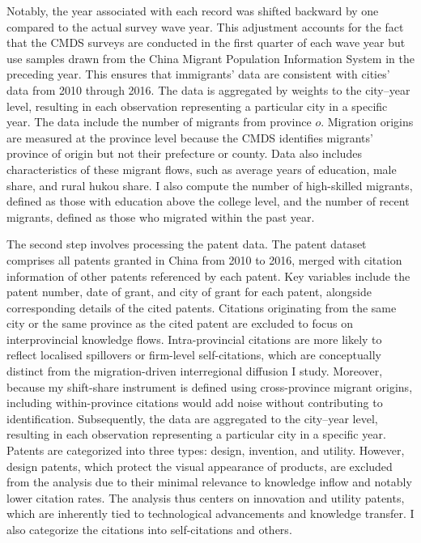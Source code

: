 \documentclass[12pt]{article}
\begin{document}
Notably, the year associated with each record was shifted backward by one compared to the actual survey wave year. This adjustment accounts for the fact that the CMDS surveys are conducted in the first quarter of each wave year but use samples drawn from the China Migrant Population Information System in the preceding year. This ensures that immigrants' data are consistent with cities' data from 2010 through 2016.
The data is aggregated by weights to the city--year level, resulting in each observation representing a particular city in a specific year. The data include the number of migrants from province $o$. Migration origins are measured at the province level because the CMDS identifies migrants' province of origin but not their prefecture or county. Data also includes characteristics of these migrant flows, such as average years of education, male share, and rural hukou share. I also compute the number of high-skilled migrants, defined as those with education above the college level, and the number of recent migrants, defined as those who migrated within the past year.

The second step involves processing the patent data. The patent dataset comprises all patents granted in China from 2010 to 2016, merged with citation information of other patents referenced by each patent. Key variables include the patent number, date of grant, and city of grant for each patent, alongside corresponding details of the cited patents.
Citations originating from the same city or the same province as the cited patent are excluded to focus on interprovincial knowledge flows. Intra-provincial citations are more likely to reflect localised spillovers or firm-level self-citations, which are conceptually distinct from the migration-driven interregional diffusion I study. Moreover, because my shift-share instrument is defined using cross-province migrant origins, including within-province citations would add noise without contributing to identification.
Subsequently, the data are aggregated to the city--year level, resulting in each observation representing a particular city in a specific year. Patents are categorized into three types: design, invention, and utility. However, design patents, which protect the visual appearance of products, are excluded from the analysis due to their minimal relevance to knowledge inflow and notably lower citation rates. The analysis thus centers on innovation and utility patents, which are inherently tied to technological advancements and knowledge transfer.
I also categorize the citations into self-citations and others.
\end{document}
